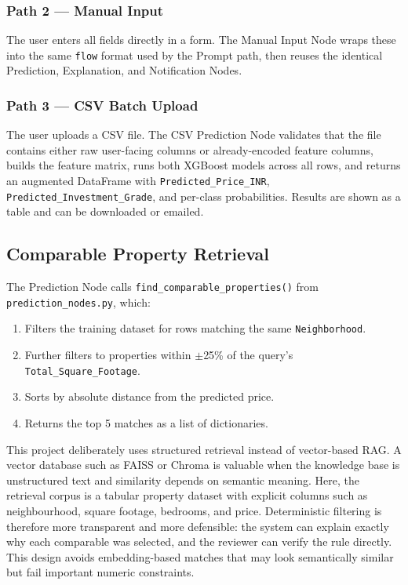 \documentclass[12pt,a4paper]{article}
\begin{document}
\subsubsection{Path 2 --- Manual Input}
The user enters all fields directly in a form. The Manual Input Node wraps these into the same \texttt{flow} format used by the Prompt path, then reuses the identical Prediction, Explanation, and Notification Nodes.

\subsubsection{Path 3 --- CSV Batch Upload}
The user uploads a CSV file. The CSV Prediction Node validates that the file contains either raw user-facing columns or already-encoded feature columns, builds the feature matrix, runs both XGBoost models across all rows, and returns an augmented DataFrame with \texttt{Predicted\_Price\_INR}, \texttt{Predicted\_Investment\_Grade}, and per-class probabilities. Results are shown as a table and can be downloaded or emailed.

\subsection{Comparable Property Retrieval}

The Prediction Node calls \texttt{find\_comparable\_properties()} from \texttt{prediction\_nodes.py}, which:

\begin{enumerate}[leftmargin=1.5em]
\item Filters the training dataset for rows matching the same \texttt{Neighborhood}.
  \item Further filters to properties within $\pm$25\% of the query's \texttt{Total\_Square\_Footage}.
  \item Sorts by absolute distance from the predicted price.
  \item Returns the top 5 matches as a list of dictionaries.
\end{enumerate}

This project deliberately uses structured retrieval instead of vector-based RAG. A vector database such as FAISS or Chroma is valuable when the knowledge base is unstructured text and similarity depends on semantic meaning. Here, the retrieval corpus is a tabular property dataset with explicit columns such as neighbourhood, square footage, bedrooms, and price. Deterministic filtering is therefore more transparent and more defensible: the system can explain exactly why each comparable was selected, and the reviewer can verify the rule directly. This design avoids embedding-based matches that may look semantically similar but fail important numeric constraints.
\end{document}
